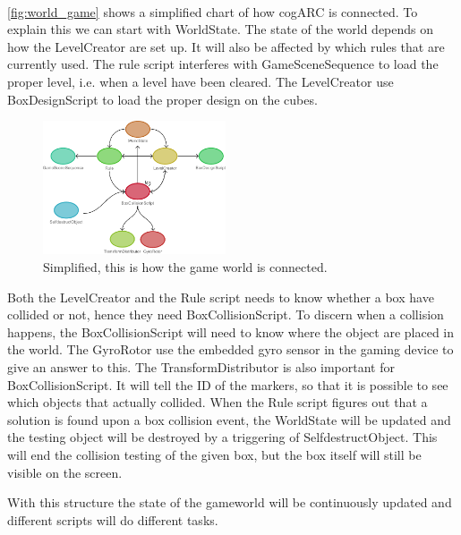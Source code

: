 
\paragraph{}

\autoref{fig:world_game} shows a simplified chart of how cogARC is connected.
To explain this we can start with WorldState. The state of the world depends on
how the LevelCreator are set up. It will also be affected by which rules that
are currently used. 
The rule script interferes with GameSceneSequence to load the proper level,
i.e. when a level have been cleared. The LevelCreator use BoxDesignScript to
load the proper design on the cubes.

\begin{figure}
        \capstart
        \centering
        \includegraphics[width=0.48\textwidth]{images/game_world_class_chart}
        \caption[World game class chart]{Simplified, this is how the game world is connected.}
        \label{fig:world_game}
        \vspace{-10pt}
\end{figure}

Both the LevelCreator and the Rule script needs to know whether a box have
collided or not, hence they need BoxCollisionScript. To discern when a collision
happens, the BoxCollisionScript will need to know where the object are placed
in the world. The GyroRotor use the embedded gyro sensor in the gaming device
to give an answer to this. The TransformDistributor is also important for 
BoxCollisionScript. It will tell the ID of the markers, so that it is possible
to see which objects that actually collided. When the Rule script figures out
that a solution is found upon a box collision event, the WorldState will be
updated and the testing object will be destroyed by a triggering of
SelfdestructObject. This will end the collision testing of the given box, but 
the box itself will still be visible on the screen.

With this structure the state of the gameworld will be continuously updated
and different scripts will do different tasks.

